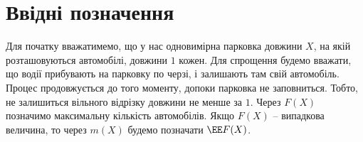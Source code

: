 \section{Ввідні позначення}

Для початку вважатимемо, що у нас одновимірна парковка довжини $X$, на якій розташовуються автомобілі, довжини $1$ кожен.
Для спрощення будемо вважати, що водії прибувають на парковку по черзі, і залишають там свій автомобіль. Процес продовжується до того моменту, допоки парковка не заповниться. Тобто, не залишиться вільного відрізку довжини не менше за $1$.
Через $F(X)$ позначимо максимальну кількість автомобілів. Якщо $F(X)$ – випадкова величина, то через $m(X)$ будемо позначати $\EE F(X)$.
